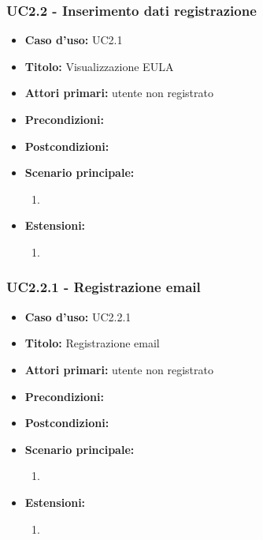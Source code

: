 \documentclass[casi-duso]{subfiles}
\begin{document}
\subsubsection{UC2.2 - Inserimento dati registrazione}
\label{subsub:uc2.2utente}
\begin{itemize}
  \item \textbf{Caso d’uso:} UC2.1 
  \item \textbf{Titolo:} Visualizzazione EULA
  \item \textbf{Attori primari:} utente non registrato
  \item \textbf{Precondizioni:} 
  \item \textbf{Postcondizioni:}  
  \item \textbf{Scenario principale:} 
  \begin{enumerate}
    \item 
  \end{enumerate}
  \item \textbf{Estensioni:} 
  \begin{enumerate}
    \item 
  \end{enumerate}     
\end{itemize}

\subsubsection{UC2.2.1 - Registrazione email}
\label{subsub:uc2.2.1utente}
\begin{itemize}
  \item \textbf{Caso d’uso:} UC2.2.1 
  \item \textbf{Titolo:} Registrazione email
  \item \textbf{Attori primari:} utente non registrato
  \item \textbf{Precondizioni:} 
  \item \textbf{Postcondizioni:}  
  \item \textbf{Scenario principale:} 
  \begin{enumerate}
    \item 
  \end{enumerate}
  \item \textbf{Estensioni:} 
  \begin{enumerate}
    \item 
  \end{enumerate}     
\end{itemize}
\end{document}
